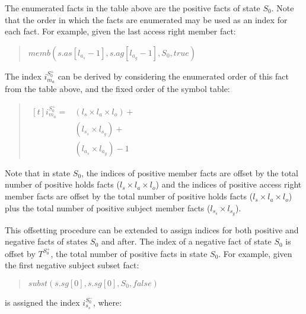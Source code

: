 \documentclass[10pt, twocolumn]{article}
\begin{document}
          The enumerated facts in the table above are the positive facts of
          state $S_{0}$. Note that the order in which the facts are enumerated
          may be used as an index for each fact. For example, given the last
          access right member fact:

          \begin{quote}
            $memb(s.as[l_{a_{s}} - 1], s.ag[l_{a_{g}} - 1], S_{0}, true)$
          \end{quote}

          The index $i^{S^{+}_{0}}_{m_{a}}$ can be derived by considering the
          enumerated order of this fact from the table above, and the fixed
          order of the symbol table:

          \begin{quote}
            \begin{math}
              \begin{aligned}[t]
                i^{S^{+}_{0}}_{m_{a}} = & (l_{s} \times l_{a} \times l_{o}) + \\
                & (l_{s_{s}} \times l_{s_{g}}) + \\
                & (l_{a_{s}} \times l_{a_{g}}) - 1
              \end{aligned}
            \end{math}
          \end{quote}

          Note that in state $S_{0}$, the indices of positive member facts are
          offset by the total number of positive holds facts
          ($l_{s} \times l_{a} \times l_{o}$) and the indices of positive
          access right member facts are offset by the total number of positive
          holds facts ($l_{s} \times l_{a} \times l_{o}$) plus the total number
          of positive subject member facts ($l_{s_{s}} \times l_{s_{g}}$).

          This offsetting procedure can be extended to assign indices for both
          positive and negative facts of states $S_{0}$ and after. The index of
          a negative fact of state $S_{0}$ is offset by $T^{S^{+}_{0}}$, the
          total number of positive facts in state $S_{0}$. For example, given
          the first negative subject subset fact:

          \begin{quote}
            $subst(s.sg[0], s.sg[0], S_{0}, false)$
          \end{quote}

          is assigned the index $i^{S^{-}_{0}}_{s_{s}}$, where:
\end{document}
